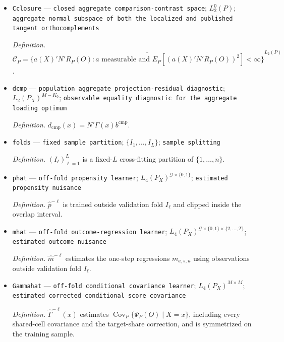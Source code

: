 \documentclass{article}
\begin{document}
\begin{itemize}
  \par\smallskip\noindent\emph{Definition.} \(b^{\mathrm{cmp}}\) denotes either named constant comparator.
  \item \texttt{Cclosure} --- \texttt{closed aggregate comparison-\allowbreak{}contrast space}; \(L_2^0(P)\); \texttt{aggregate normal subspace of both the localized and published tangent orthocomplements}
  \par\smallskip\noindent\emph{Definition.} \(\mathcal C_P=\overline{\{a(X)'N'R_P(O):a\text{ measurable and }E_P[(a(X)'N'R_P(O))^2]<\infty\}}^{L_2(P)}\).
  \item \texttt{dcmp} --- \texttt{population aggregate projection-\allowbreak{}residual diagnostic}; \(L_2(P_X)^{M-K_0}\); \texttt{observable equality diagnostic for the aggregate loading optimum}
  \par\smallskip\noindent\emph{Definition.} \(d_{\mathrm{cmp}}(x)=N'\Gamma(x)b^{\mathrm{cmp}}\).
  \item \texttt{folds} --- \texttt{fixed sample partition}; \(\{I_1,\ldots,I_L\}\); \texttt{sample splitting}
  \par\smallskip\noindent\emph{Definition.} \((I_\ell)_{\ell=1}^L\) is a fixed-\(L\) cross-fitting partition of \(\{1,\ldots,n\}\).
  \item \texttt{phat} --- \texttt{off-\allowbreak{}fold propensity learner}; \(L_4(P_X)^{\mathcal G\times\{0,1\}}\); \texttt{estimated propensity nuisance}
  \par\smallskip\noindent\emph{Definition.} \(\widehat p^{-\ell}\) is trained outside validation fold \(I_\ell\) and clipped inside the overlap interval.
  \item \texttt{mhat} --- \texttt{off-\allowbreak{}fold outcome-\allowbreak{}regression learner}; \(L_4(P_X)^{\mathcal G\times\{0,1\}\times\{2,\ldots,T\}}\); \texttt{estimated outcome nuisance}
  \par\smallskip\noindent\emph{Definition.} \(\widehat m^{-\ell}\) estimates the one-step regressions \(m_{a,s,u}\) using observations outside validation fold \(I_\ell\).
  \item \texttt{Gammahat} --- \texttt{off-\allowbreak{}fold conditional covariance learner}; \(L_4(P_X)^{M\times M}\); \texttt{estimated corrected conditional score covariance}
  \par\smallskip\noindent\emph{Definition.} \(\widehat\Gamma^{-\ell}(x)\) estimates \(\operatorname{Cov}_P\{\Psi_P(O)\mid X=x\}\), including every shared-cell covariance and the target-share correction, and is symmetrized on the training sample.

\end{itemize}
\end{document}
